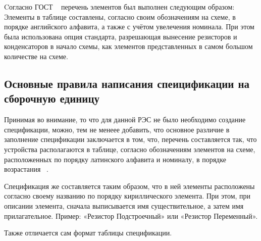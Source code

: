 Cогласно ГОСТ ~\cite{GOST-SEL} перечень
элементов был выполнен следующим образом:
Элементы в таблице составлены,
согласно своим обозначениям на схеме, в порядке английского алфавита,
а также с учётом увелечения номинала.
При этом была использована опция стандарта,
разрешающая вынесение резисторов и конденсаторов
в начало схемы, как элементов представленных
в самом большом количестве на схеме.

\subsection{Основные правила написания спеицификации на сборочную единицу}

Принимая во внимание,
то что для данной РЭС не было необходимо создание спецификации,
можно, тем не менеее добавить,
что основное различие в заполнение спецификации заключается в том,
что, перечень составляется так, что устройства располагаются в таблице,
согласно обозначениям элементов на схеме,
расположенных по порядку латинского алфавита и номиналу,
в порядке возрастания ~\cite{GOST-spec}.

Спецификация же составляется таким образом,
что в ней элементы расположены согласно своему названию по порядку
кириллического элемента. При этом, при описании элемента,
сначала выписывается имя существительное, а затем имя прилагательное.
Пример: «Резистор Подстроечный» или «Резистор Переменный».

Также отличается сам формат таблицы спецификации.

\newpage
